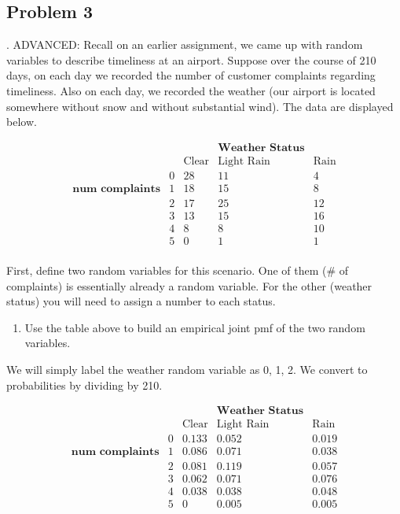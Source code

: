 \documentclass[
]{book}
\providecommand{\tightlist}{%
  \setlength{\itemsep}{0pt}\setlength{\parskip}{0pt}}
\begin{document}
\hypertarget{problem-3-9}{%
\subsection{Problem 3}\label{problem-3-9}}

. ADVANCED: Recall on an earlier assignment, we came up with random variables to describe timeliness at an airport. Suppose over the course of 210 days, on each day we recorded the number of customer complaints regarding timeliness. Also on each day, we recorded the weather (our airport is located somewhere without snow and without substantial wind). The data are displayed below.

\[
\begin{array}{cc|ccc} & & &\textbf{Weather Status} &
\\ & & \mbox{Clear} & \mbox{Light Rain} & \mbox{Rain}  \\
&\hline 0 & 28 & 11 & 4  \\
\textbf{num complaints} & 1 & 18 & 15 & 8 \\
& 2 & 17 & 25 & 12  \\
& 3 & 13 & 15 & 16  \\
& 4 & 8 & 8 & 10 \\
& 5 & 0 & 1 & 1 \\
\end{array} 
\]

First, define two random variables for this scenario. One of them (\# of complaints) is essentially already a random variable. For the other (weather status) you will need to assign a number to each status.

\begin{enumerate}
\def\labelenumi{\alph{enumi}.}
\tightlist
\item
  Use the table above to build an empirical joint pmf of the two random variables.
\end{enumerate}

We will simply label the weather random variable as 0, 1, 2. We convert to probabilities by dividing by 210.

\[
\begin{array}{cc|ccc} & & &\textbf{Weather Status} &
\\ & & \mbox{Clear} & \mbox{Light Rain} & \mbox{Rain}  \\
&\hline 0 & 0.133 & 0.052 & 0.019  \\
\textbf{num complaints} & 1 & 0.086 & 0.071 & 0.038  \\
& 2 & 0.081 & 0.119 & 0.057  \\
& 3 & 0.062 & 0.071 & 0.076  \\
& 4 & 0.038 & 0.038 & 0.048 \\
& 5 & 0 & 0.005 & 0.005 \\
\end{array} 
\]
\end{document}
